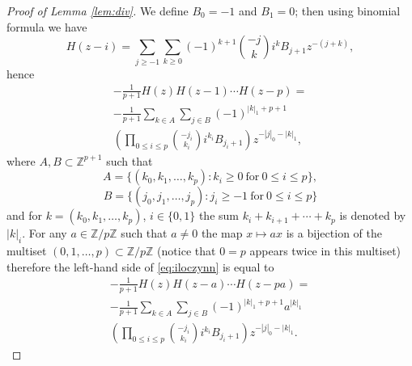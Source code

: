 \documentclass[12pt]{amsart}
\theoremstyle{plain}
\theoremstyle{remark}
\newcommand{\Z}{\mathbb{Z}}
\begin{document}
\begin{proof}[Proof of Lemma \ref{lem:div}]
We define ${B}_0 = -1$ and ${B}_1 = 0$; then using binomial formula we have
$$ 
H(z-i)=\sum_{j\geq-1}\sum_{k\geq 0} 
(-1)^{k+1} \binom{-j}{k} i^k {B}_{j+1}  z^{-(j+k)}, $$
hence
\begin{multline}
\label{eq:iloczynn}
-\frac{1}{p+1} H(z)H(z-1)\cdots H(z-p) = 
\\ -\frac{1}{p+1} \sum_{k \in A} \sum_{j \in B}
(-1)^{|k|_1+p+1} 
\\
\left(\prod_{0 \leq i \leq
p}\binom{-j_i}{k_i}i^{k_i}{B}_{j_i+1}\right)
z^{-|j|_0-|k|_1},
\end{multline}
where $A,B \subset \Z^{p+1}$ such that 
$$A = \{(k_0,k_1,\dots,k_p): k_i \geq 0\
\text{for}\ 0 \leq i \leq p\},$$ 
$$B = \{(j_0, j_1,\dots,j_p): j_i \geq -1\
\text{for}\ 0 \leq i \leq p\}$$ 
and for $k = (k_0, k_1, \dots, k_p)$, $i \in \{0,1\}$ the sum
$k_i + k_{i+1} +\cdots + k_p$ is denoted by $|k|_i$.
 For any $a\in
\Z/p\Z$ such that $a\neq 0$ the map $x\mapsto ax$ is a bijection of the multiset
$(0,1,\dots,p)\subset\Z/p\Z$ (notice that $0=p$ appears twice in this multiset)
therefore the left-hand side of \eqref{eq:iloczynn} is equal to 
\begin{multline}
\label{eq:iloczynn2}
-\frac{1}{p+1} H(z)H(z-a)\cdots H(z-pa) = 
\\ -\frac{1}{p+1} \sum_{k \in A} \sum_{j \in B}
(-1)^{|k|_1+p+1} a^{|k|_1} 
\\
\left(\prod_{0 \leq i \leq
p}\binom{-j_i}{k_i}i^{k_i}{B}_{j_i+1}\right)
z^{-|j|_0-|k|_1}.
\end{multline}


\end{proof}
\end{document}
